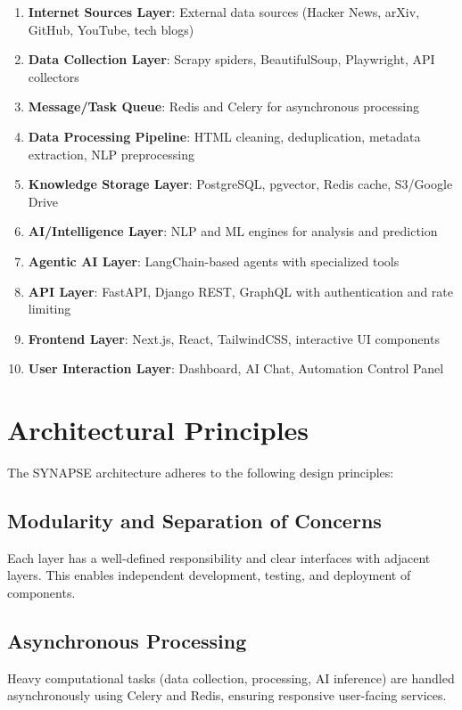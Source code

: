 \documentclass[12pt,a4paper]{report}
\begin{document}
\begin{enumerate}
    \item \textbf{Internet Sources Layer}: External data sources (Hacker News, arXiv, GitHub, YouTube, tech blogs)
    \item \textbf{Data Collection Layer}: Scrapy spiders, BeautifulSoup, Playwright, API collectors
    \item \textbf{Message/Task Queue}: Redis and Celery for asynchronous processing
    \item \textbf{Data Processing Pipeline}: HTML cleaning, deduplication, metadata extraction, NLP preprocessing
    \item \textbf{Knowledge Storage Layer}: PostgreSQL, pgvector, Redis cache, S3/Google Drive
    \item \textbf{AI/Intelligence Layer}: NLP and ML engines for analysis and prediction
    \item \textbf{Agentic AI Layer}: LangChain-based agents with specialized tools
    \item \textbf{API Layer}: FastAPI, Django REST, GraphQL with authentication and rate limiting
    \item \textbf{Frontend Layer}: Next.js, React, TailwindCSS, interactive UI components
    \item \textbf{User Interaction Layer}: Dashboard, AI Chat, Automation Control Panel
\end{enumerate}

\section{Architectural Principles}

The SYNAPSE architecture adheres to the following design principles:

\subsection{Modularity and Separation of Concerns}
Each layer has a well-defined responsibility and clear interfaces with adjacent layers. This enables independent development, testing, and deployment of components.

\subsection{Asynchronous Processing}
Heavy computational tasks (data collection, processing, AI inference) are handled asynchronously using Celery and Redis, ensuring responsive user-facing services.
\end{document}
